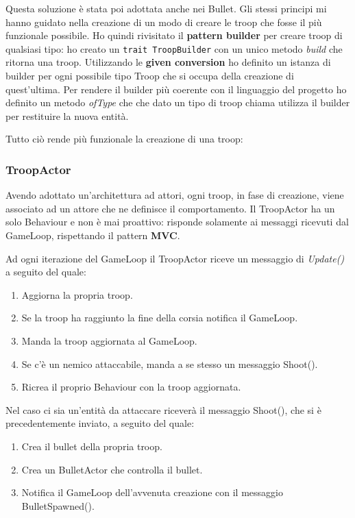 

Questa soluzione è stata poi adottata anche nei Bullet.
Gli stessi principi mi hanno guidato nella creazione di un modo di creare le troop che fosse il più funzionale possibile.
Ho quindi rivisitato il \textbf{pattern builder} per creare troop di qualsiasi tipo: ho creato un \texttt{trait TroopBuilder}
con un unico metodo \textit{build} che ritorna una troop.
Utilizzando le \textbf{given conversion} ho definito un istanza di builder per ogni possibile tipo Troop che si occupa
della creazione di quest'ultima.
Per rendere il builder più coerente con il linguaggio del progetto ho definito un metodo \textit{ofType} che che dato un tipo
di troop chiama utilizza il builder per restituire la nuova entità.



Tutto ciò rende più funzionale la creazione di una troop:



\subsubsection{TroopActor}
Avendo adottato un'architettura ad attori, ogni troop, in fase di creazione, viene associato ad un attore che ne definisce il comportamento.
Il TroopActor ha un solo Behaviour e non è mai proattivo: risponde solamente ai messaggi ricevuti dal GameLoop, rispettando il pattern \textbf{MVC}.

Ad ogni iterazione del GameLoop il TroopActor riceve un messaggio di \textit{Update()} a seguito del quale:
\begin{enumerate}
    \item Aggiorna la propria troop.
    \item Se la troop ha raggiunto la fine della corsia notifica il GameLoop.
    \item Manda la troop aggiornata al GameLoop.
    \item Se c'è un nemico attaccabile, manda a se stesso un messaggio Shoot().
    \item Ricrea il proprio Behaviour con la troop aggiornata.
\end{enumerate}

Nel caso ci sia un'entità da attaccare riceverà il messaggio Shoot(), che si è precedentemente inviato, a seguito del quale:

\begin{enumerate}
    \item Crea il bullet della propria troop.
    \item Crea un BulletActor che controlla il bullet.
    \item Notifica il GameLoop dell'avvenuta creazione con il messaggio BulletSpawned().
\end{enumerate}

